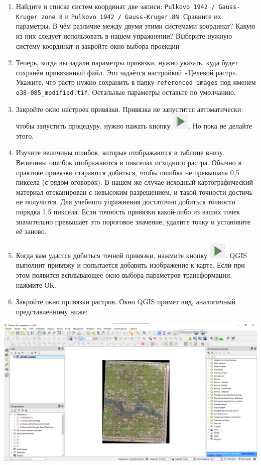 \documentclass[
  12pt,
]{book}
\begin{document}
\begin{enumerate}
\def\labelenumi{\arabic{enumi}.}
\setcounter{enumi}{14}
\item
  Найдите в списке систем координат две записи: \texttt{Pulkovo\ 1942\ /\ Gauss-Kruger\ zone\ 8} и \texttt{Pulkovo\ 1942\ /\ Gauss-Kruger\ 8N}. Сравните их параметры. В чём различие между двумя этими системами координат? Какую из них следует использовать в нашем упражнении? Выберите нужную систему координат и закройте окно выбора проекции
\item
  Теперь, когда вы задали параметры привязки, нужно указать, куда будет сохранён привязанный файл. Это задаётся настройкой «Целевой растр». Укажите, что растр нужно сохранить в папку \texttt{referenced\_images} под именем \texttt{o38-085\_modified.tif}. Остальные параметры оставьте по умолчанию.
\item
  Закройте окно настроек привязки. Привязка не запустится автоматически: чтобы запустить процедуру, нужно нажать кнопку \includegraphics{images/Ex05_Reference/beginButton.png}. Но пока не делайте этого.
\item
  Изучите величины ошибок, которые отображаются в таблице внизу. Величины ошибок отображаются в пикселах исходного растра. Обычно в практике привязки стараются добиться, чтобы ошибка не превышала 0,5 пиксела (с рядом оговорок). В нашем же случае исходный картографический материал отсканирован с невысоким разрешением, и такой точности достичь не получится. Для учебного упражнения достаточно добиться точности порядка 1,5 пиксела. Если точность привязки какой-либо из ваших точек значительно превышает это пороговое значение, удалите точку и установите её заново.
\item
  Когда вам удастся добиться точной привязки, нажмите кнопку \includegraphics{images/Ex05_Reference/beginButton.png}. QGIS выполнит привязку и попытается добавить изображение к карте. Если при этом появится всплывающее окно выбора параметров трансформации, нажмите ОК.
\item
  Закройте окно привязки растров. Окно QGIS примет вид, аналогичный представленному ниже:
\end{enumerate}

\includegraphics{images/Ex05_Reference/QGIS1.png}
\end{document}
